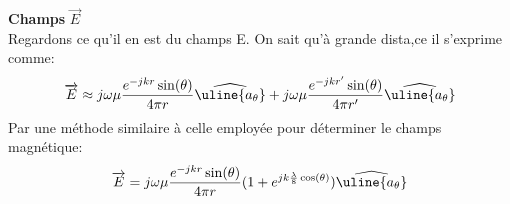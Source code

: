 \documentclass[10pt,a4paper]{article}
\newcommand{\Base}[1]{\widehat{\uline{a_{#1}}}} %
\begin{document}
\textbf{Champs} $\overrightarrow{E}$\\
Regardons ce qu'il en est du champs E. On sait qu'à grande dista,ce il s'exprime comme:
\begin{equation}
\overrightarrow{E}\approx j\omega \mu \frac{e^{-jkr} \sin (\theta )}{4 \pi r} \Base{\theta}+j\omega \mu \frac{e^{-jkr'} \sin (\theta )}{4 \pi r'} \Base{\theta}
\end{equation}
Par une méthode similaire à celle employée pour déterminer le champs magnétique:
\begin{equation}
\overrightarrow{E}= j\omega \mu \frac{e^{-jkr} \sin (\theta )}{4 \pi r}(1+e^{jk\frac{\lambda}{8}\cos (\theta)}) \Base{\theta}
\end{equation}
\end{document}

